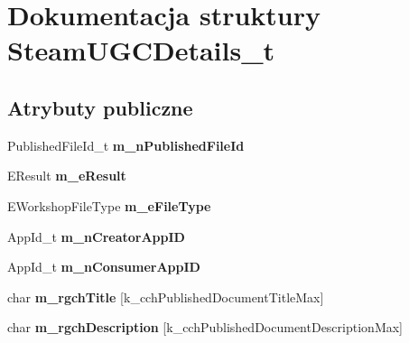 \hypertarget{struct_steam_u_g_c_details__t}{}\section{Dokumentacja struktury Steam\+U\+G\+C\+Details\+\_\+t}
\label{struct_steam_u_g_c_details__t}
\subsection*{Atrybuty publiczne}
\begin{DoxyCompactItemize}
\item 
\mbox{\label{struct_steam_u_g_c_details__t_abf1ab7c590bca6df10b125c9c43a6353}} 
Published\+File\+Id\+\_\+t {\bfseries m\+\_\+n\+Published\+File\+Id}
\item 
\mbox{\label{struct_steam_u_g_c_details__t_a5448666b2f9cce824ab0166f838b418e}} 
E\+Result {\bfseries m\+\_\+e\+Result}
\item 
\mbox{\label{struct_steam_u_g_c_details__t_af563a2cd3d7368fd5f5651aa5f5abf2b}} 
E\+Workshop\+File\+Type {\bfseries m\+\_\+e\+File\+Type}
\item 
\mbox{\label{struct_steam_u_g_c_details__t_a8763f843e1761df0cb55acc425e4adcd}} 
App\+Id\+\_\+t {\bfseries m\+\_\+n\+Creator\+App\+ID}
\item 
\mbox{\label{struct_steam_u_g_c_details__t_ad5bce931c752397229715a0906670c6d}} 
App\+Id\+\_\+t {\bfseries m\+\_\+n\+Consumer\+App\+ID}
\item 
\mbox{\label{struct_steam_u_g_c_details__t_a9c4f233425fb3d2a4ca5ce4df2ac7b21}} 
char {\bfseries m\+\_\+rgch\+Title} \mbox{[}k\+\_\+cch\+Published\+Document\+Title\+Max\mbox{]}
\item 
\mbox{\label{struct_steam_u_g_c_details__t_a75803d008cb392bb2930e6789e1f28a4}} 
char {\bfseries m\+\_\+rgch\+Description} \mbox{[}k\+\_\+cch\+Published\+Document\+Description\+Max\mbox{]}
\item 
\mbox{\label{struct_steam_u_g_c_details__t_a3e20b55373826fcf98333685ffab5316}} 

\end{DoxyCompactItemize}
